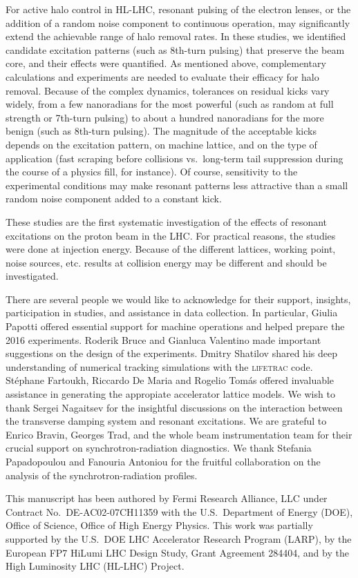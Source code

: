 \documentclass[aps
,prstab
,reprint
,longbibliography
,preprintnumbers
,showkeys
,amsfonts,amssymb,amsmath
,floatfix
]{revtex4-1}
\newcommand{\code}[1]{\textsc{#1}} %
\newcommand{\seventhtp}{7th-turn pulsing}
\newcommand{\eighthtp}{8th-turn pulsing}
\begin{document}
For active halo control in HL-LHC, resonant pulsing of the electron
lenses, or the addition of a random noise component to continuous
operation, may significantly extend the achievable range of halo
removal rates.  In these studies, we identified candidate excitation
patterns (such as \eighthtp) that preserve the beam core, and their
effects were quantified. As mentioned above, complementary
calculations and experiments are needed to evaluate their efficacy for
halo removal. Because of the complex dynamics, tolerances on residual
kicks vary widely, from a few nanoradians for the most powerful (such
as random at full strength or \seventhtp) to about a hundred
nanoradians for the more benign (such as \eighthtp). The magnitude of
the acceptable kicks depends on the excitation pattern, on machine
lattice, and on the type of application (fast scraping before
collisions vs.\ long-term tail suppression during the course of a
physics fill, for instance). Of course, sensitivity to the
experimental conditions may make resonant patterns less attractive
than a small random noise component added to a constant kick.

These studies are the first systematic investigation of the effects of
resonant excitations on the proton beam in the LHC.  For practical
reasons, the studies were done at injection energy. Because of the
different lattices, working point, noise sources, etc. results at
collision energy may be different and should be investigated.


\begin{acknowledgments}
  There are several people we would like to acknowledge for their
  support, insights, participation in studies, and assistance in data
  collection. In particular, Giulia Pa\-potti offered essential
  support for machine operations and helped prepare the 2016
  experiments. Roderik Bruce and Gianluca Va\-len\-ti\-no made
  important suggestions on the design of the experiments. Dmitry
  Sha\-ti\-lov shared his deep understanding of numerical tracking
  simulations with the \code{lifetrac} code. St\'{e}\-phane
  Far\-toukh, Ric\-car\-do De Maria and Ro\-ge\-lio Tom\'{a}s offered
  invaluable assistance in generating the appropiate accelerator
  lattice models. We wish to thank Sergei Na\-gai\-tsev for the
  insightful discussions on the interaction between the transverse
  damping system and resonant excitations. We are grateful to
  En\-ri\-co Bra\-vin, Georges Trad, and the whole beam
  instrumentation team for their crucial support on
  synchrotron-radiation diagnostics. We thank Ste\-fania
  Pa\-pa\-do\-pou\-lou and Fa\-nou\-ria An\-to\-niou for the fruitful
  collaboration on the analysis of the synchrotron-radiation profiles.

  This manuscript has been authored by Fermi Research Alliance,
  LLC under Contract No.~DE-AC02-07CH11359 with the U.S.\ Department
  of Energy (DOE), Office of Science, Office of High Energy
  Physics. This work was partially supported by the U.S.\ DOE LHC
  Accelerator Research Program (LARP), by the European FP7 HiLumi LHC
  Design Study, Grant Agreement 284404, and by the High Luminosity LHC
  (HL-LHC) Project.
\end{acknowledgments}



\end{document}
